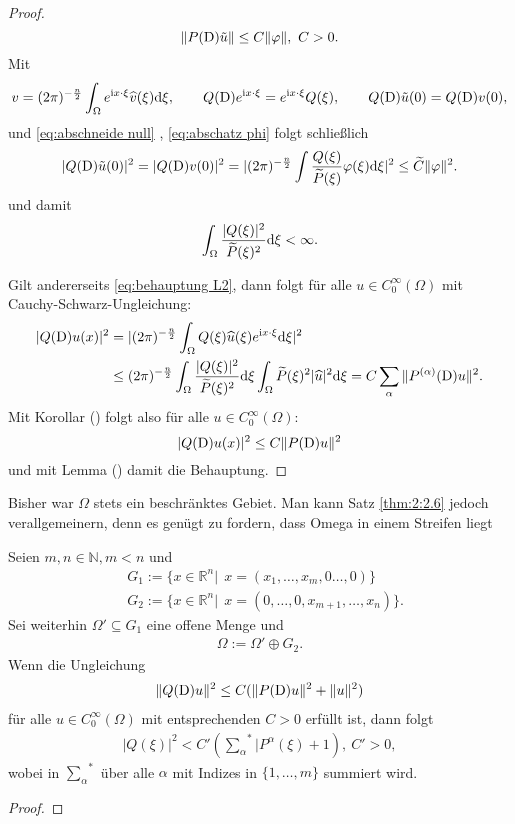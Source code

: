 \begin{proof}
\begin{equation}\label{eq:abschatz phi}
\Vert P(\D) \tilde{u} \Vert \leq C \Vert \varphi \Vert, \ C>0.
\end{equation}
Mit
\begin{equation}
v = (2 \pi)^{-\frac{n}{2}} \int_{\Omega} e^{\mathrm i x \cdot \xi} \widehat{v}(\xi) \mathrm{d}\xi, \qquad Q(\mathrm D)e^{\mathrm i x \cdot \xi} = e^{\mathrm i x \cdot \xi} Q(\xi), \qquad Q(\mathrm D)\tilde{u}(0) = Q(\mathrm D)v(0),
\end{equation}
und \eqref{eq:abschneide null} , \eqref{eq:abschatz phi} folgt schließlich
\begin{equation}
|Q(\mathrm D)\tilde{u}(0)|^2 = |Q(\mathrm D)v(0)|^2 = |(2 \pi)^{-\frac{n}{2}} \int \frac{Q(\xi)}{\widetilde{P}(\xi)} \varphi(\xi) \mathrm{d}\xi |^2 \leq \widetilde{C} \Vert \varphi \Vert^2.
\end{equation}
und damit
\begin{equation}\label{eq:behauptung L2}
\int_{\Omega} \frac{|Q(\xi)|^2}{\widetilde{P}(\xi)^2} \mathrm{d}\xi < \infty.
\end{equation}

Gilt andererseits \eqref{eq:behauptung L2}, dann folgt für alle $u \in C_0^{\infty}(\Omega)$ mit Cauchy-Schwarz-Ungleichung:
\begin{align}
|Q(\mathrm D)u(x)|^2 &=  |(2 \pi)^{-\frac{n}{2}} \int_{\Omega} Q(\xi) \widehat{u}(\xi) e^{\mathrm i x \cdot \xi} \mathrm{d}\xi |^2 
\\ & \leq (2 \pi)^{-\frac{n}{2}} \int_{\Omega} \frac{|Q(\xi)|^2}{\widetilde{P}(\xi)^2} \mathrm{d}\xi \int_{\Omega} \widetilde{P}(\xi)^2 | \widehat{u}|^2 \mathrm{d}\xi = C \sum_{\alpha} \Vert P^{(\alpha)}(\mathrm D)u\Vert^2.
\end{align}
Mit Korollar () folgt also für alle $u \in C_0^{\infty}(\Omega)$:
\begin{equation}
|Q(\mathrm D)u(x)|^2 \leq C \Vert P(\mathrm D)u\Vert^2
\end{equation}
und mit Lemma () damit die Behauptung.
\end{proof}
Bisher war $\Omega$ stets ein beschränktes Gebiet. Man kann Satz \ref{thm:2:2.6} jedoch verallgemeinern, denn es genügt zu fordern, dass Omega in einem Streifen liegt
\begin{thm}
Seien $m,n \in \mathbb{N}, m<n$ und
\begin{align*}
 &G_1:= \{x \in \mathbb{R}^n| \ \ x=(x_1,\ldots, x_m, 0 \ldots,0)\} \\ & G_2:=\{x \in \mathbb{R}^n| \ \ x = (0,\ldots,0,x_{m+1},\ldots,x_n)\}.
\end{align*}
Sei weiterhin $\Omega' \subseteq G_1$ eine offene Menge und
\begin{align*}
\Omega := \Omega' \oplus G_2.
\end{align*}
Wenn die Ungleichung
\begin{align*}
\Vert Q(\mathrm D) u \Vert^2 \leq C( \Vert P(\mathrm D) u \Vert^2 + \Vert u\Vert^2)
\end{align*}
für alle $u \in C_0^{\infty}(\Omega)$ mit entsprechenden $C>0$ erfüllt ist, dann folgt
\begin{align*}
|Q(\xi)|^2 < C'({\sum_{\alpha}}^{\ast}|P^{\alpha}(\xi)+1), \ C' >0,
\end{align*}
wobei in ${\sum_{\alpha}}^{\ast}$ über alle $\alpha$ mit Indizes in $\{1,\ldots,m\}$ summiert wird.
\end{thm}
\begin{proof}

\end{proof}
